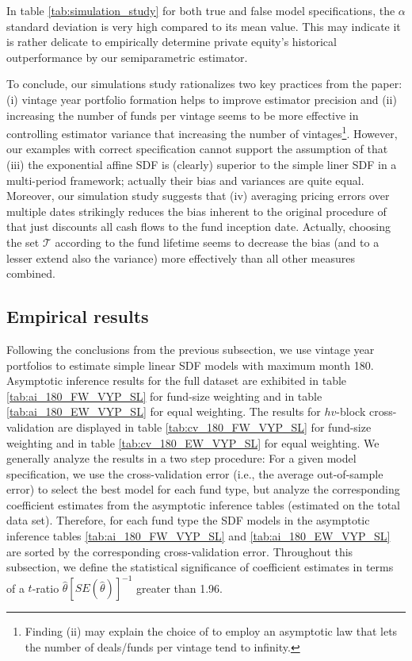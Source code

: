 \documentclass[12pt]{article}
\begin{document}
In table \ref{tab:simulation_study} for both true and false model specifications, the $\alpha$ standard deviation is very high compared to its mean value.
This may indicate it is rather delicate to empirically determine private equity's historical outperformance by our semiparametric estimator. \newline

To conclude, our simulations study rationalizes two key practices from the \cite{DLP12} paper: (i) vintage year portfolio formation helps to improve estimator precision and (ii) increasing the number of funds per vintage seems to be more effective in controlling estimator variance that increasing the number of vintages\footnote{Finding (ii) may explain the choice of \cite{DLP12} to employ an asymptotic law that lets the number of deals/funds per vintage tend to infinity.}.
However, our examples with correct specification cannot support the assumption of \cite{KN16} that (iii) the exponential affine SDF is (clearly) superior to the simple liner SDF in a multi-period framework; actually their bias and variances are quite equal.
Moreover, our simulation study suggests that (iv) averaging pricing errors over multiple dates strikingly reduces the bias inherent to the original procedure of \cite{DLP12} that just discounts all cash flows to the fund inception date.
Actually, choosing the set $\mathcal{T}$ according to the fund lifetime seems to decrease the bias (and to a lesser extend also the variance) more effectively than all other measures combined.



\subsection{Empirical results}

Following the conclusions from the previous subsection, we use vintage year portfolios to estimate simple linear SDF models with maximum month 180.
Asymptotic inference results for the full dataset are exhibited in table \ref{tab:ai_180_FW_VYP_SL} for fund-size weighting and in table \ref{tab:ai_180_EW_VYP_SL} for equal weighting.
The results for $hv$-block cross-validation are displayed in table \ref{tab:cv_180_FW_VYP_SL} for fund-size weighting and in table \ref{tab:cv_180_EW_VYP_SL} for equal weighting.
We generally analyze the results in a two step procedure: For a given model specification, we use the cross-validation error (i.e., the average out-of-sample error) to select the best model for each fund type, but analyze the corresponding coefficient estimates from the asymptotic inference tables (estimated on the total data set).
Therefore, for each fund type the SDF models in the asymptotic inference tables \ref{tab:ai_180_FW_VYP_SL} and \ref{tab:ai_180_EW_VYP_SL} are sorted by the corresponding cross-validation error.
Throughout this subsection, we define the statistical significance of coefficient estimates in terms of a $t$-ratio $\hat{\theta}[SE(\hat{\theta})]^{-1}$ greater than 1.96.
\end{document}

